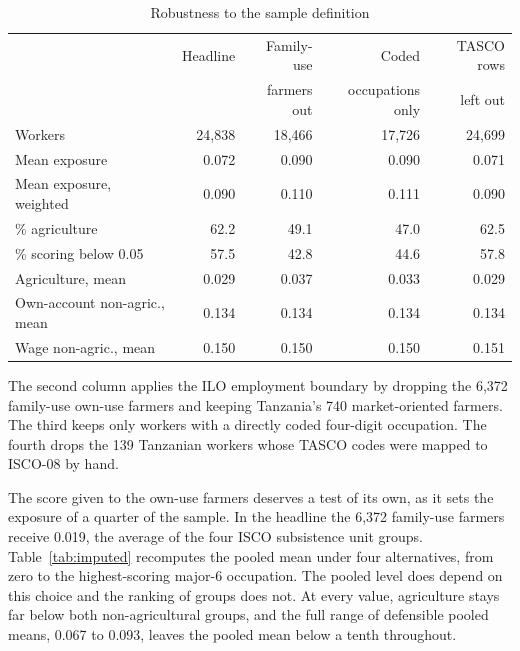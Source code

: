 \begin{table}[ht]
\centering
\caption{Robustness to the sample definition}
\label{tab:robust}
\small
\begin{tabular}{lrrrr}
\toprule
 & Headline & Family-use & Coded & TASCO rows \\
 &          & farmers out & occupations only & left out \\
\midrule
Workers                        & 24{,}838 & 18{,}466 & 17{,}726 & 24{,}699 \\
Mean exposure                  & 0.072 & 0.090 & 0.090 & 0.071 \\
Mean exposure, weighted        & 0.090 & 0.110 & 0.111 & 0.090 \\
\% agriculture                 & 62.2  & 49.1  & 47.0  & 62.5 \\
\% scoring below 0.05          & 57.5  & 42.8  & 44.6  & 57.8 \\
Agriculture, mean              & 0.029 & 0.037 & 0.033 & 0.029 \\
Own-account non-agric., mean   & 0.134 & 0.134 & 0.134 & 0.134 \\
Wage non-agric., mean          & 0.150 & 0.150 & 0.150 & 0.151 \\
\bottomrule
\end{tabular}

\vspace{4pt}
\begin{minipage}{0.9\linewidth}
\footnotesize
The second column applies the ILO employment boundary \citep{icls2013} by
dropping the 6,372 family-use own-use farmers and keeping Tanzania's 740
market-oriented farmers. The third keeps only workers with a directly coded
four-digit occupation. The fourth drops the 139 Tanzanian workers whose TASCO
codes were mapped to ISCO-08 by hand.
\end{minipage}
\end{table}

The score given to the own-use farmers deserves a test of its own, as it sets
the exposure of a quarter of the sample. In the headline the 6,372
family-use farmers receive 0.019, the average of the four ISCO subsistence
unit groups. Table~\ref{tab:imputed} recomputes the pooled mean under four
alternatives, from zero to the highest-scoring major-6 occupation.
The pooled level does depend on this choice and the
ranking of groups does not. At every value, agriculture stays far below both
non-agricultural groups, and the full range of defensible pooled means, 0.067 to
0.093, leaves the pooled mean below a tenth throughout.

